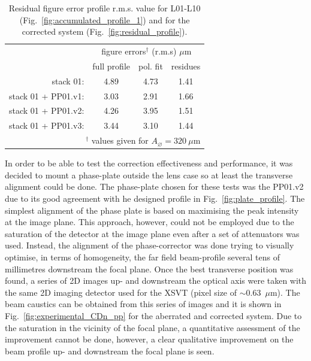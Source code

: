 \begin{refsection}
\begin{table}[t]
    \caption[Residual figure error profile r.m.s. value for L01-L10 and for the corrected system]{Residual figure error profile r.m.s. value for L01-L10 (Fig.~\ref{fig:accumulated_profile_1}) and for the corrected system (Fig.~\ref{fig:residual_profile}).}
    \centering
    \label{tab:corrected_xsvt}\small
    \begin{tabular}{rccc}
    \hline \hline
    &\multicolumn{3}{c}{figure errors$^\dagger$ (r.m.s) $\mu$m}\\ \cline{2-4}
    &full profile & pol. fit   & residues \\ \hline
    stack 01:           &4.89  &4.73  &1.41\\
    stack 01 + PP01.v1: &3.03  &2.91  &1.66\\
    stack 01 + PP01.v2: &4.26  &3.95  &1.51\\
    stack 01 + PP01.v3: &3.44  &3.10  &1.44\\
    \hline \hline
    \multicolumn{4}{r}{\footnotesize{$^\dagger$ values given for $A_{\diameter}=320~\mu\text{m}$}}     
    \end{tabular}
\end{table}

In order to be able to test the correction effectiveness and performance, it was decided to mount a phase-plate outside the lens case so at least the transverse alignment could be done. The phase-plate chosen for these tests was the PP01.v2 due to its good agreement with he designed profile in Fig.~\ref{fig:plate_profile}. The simplest alignment of the phase plate is based on maximising the peak intensity at the image plane. This approach, however, could not be employed due to the saturation of the detector at the image plane even after a set of attenuators was used. Instead, the alignment of the phase-corrector was done trying to visually optimise, in terms of homogeneity, the far field beam-profile several tens of millimetres downstream the focal plane. Once the best transverse position was found, a series of 2D images up- and downstream the optical axis were taken with the same 2D imaging detector used for the XSVT (pixel size of $\sim$0.63~$\mu$m). The beam caustics can be obtained from this series of images and it is shown in Fig.~\ref{fig:experimental_CDn_pp} for the aberrated and corrected system. Due to the saturation in the vicinity of the focal plane, a quantitative assessment of the improvement cannot be done, however, a clear qualitative improvement on the beam profile up- and downstream the focal plane is seen.



\end{refsection}
